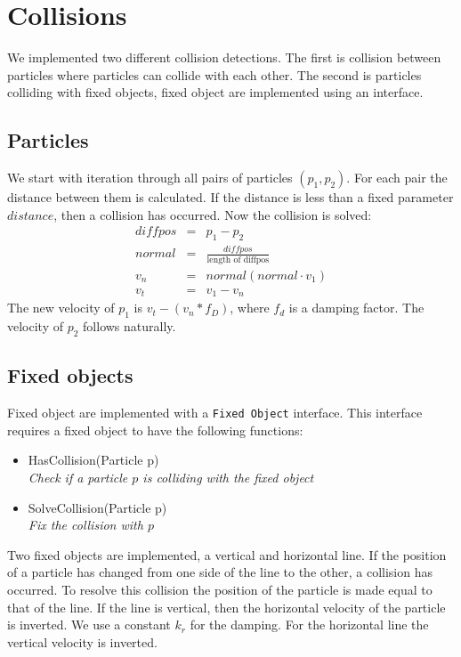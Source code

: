 \section{Collisions}
We implemented two different collision detections.
The first is collision between particles where particles can collide with each other.
The second is particles colliding with fixed objects, fixed object are implemented using an interface.

\subsection{Particles}
We start with iteration through all pairs of particles $(p_1, p_2)$.
For each pair the distance between them is calculated.
If the distance is less than a fixed parameter $distance$, then a collision has occurred.
Now the collision is solved:\\
\begin{eqnarray*}
     \mathit{diffpos} &=& p_1 - p_2 \\
     \mathit{normal} &=& \frac{\mathit{diffpos}}{\text{length of diffpos}} \\
     v_n &=& \mathit{normal} (\mathit{normal} \cdot v_1) \\
     v_t &=& v_1 - v_n
\end{eqnarray*}
The new velocity of $p_1$ is $v_t - (v_n * f_D)$, where $f_d$ is a damping factor.
The velocity of $p_2$ follows naturally.

\subsection{Fixed objects}
Fixed object are implemented with a \verb"Fixed Object" interface.
This interface requires a fixed object to have the following functions:
\begin{itemize}
  \item HasCollision(Particle p)\\
  \emph{ Check if a particle $p$ is colliding with the fixed object }
  \item SolveCollision(Particle p)\\
  \emph{ Fix the collision with $p$ }
\end{itemize}
Two fixed objects are implemented, a vertical and horizontal line.
If the position of a particle has changed from one side of the line to the other, a collision has occurred.
To resolve this collision the position of the particle is made equal to that of the line.
If the line is vertical, then the horizontal velocity of the particle is inverted.
We use a constant $k_r$ for the damping.
For the horizontal line the vertical velocity is inverted.

